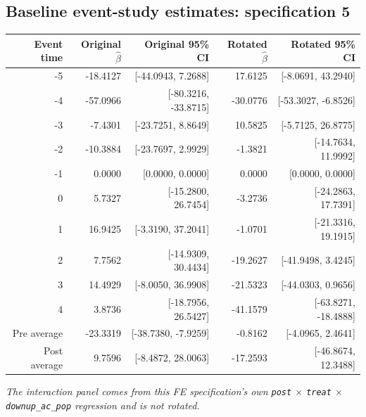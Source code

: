 \documentclass[10pt]{article}
\begin{document}
\subsection*{Baseline event-study estimates: specification 5}
\begin{center}
\scriptsize
\begin{tabular}{r rr rr}
\toprule
Event time & Original $\hat\beta$ & Original 95\% CI & Rotated $\hat\beta$ & Rotated 95\% CI \\
\midrule
-5 & -18.4127 & [-44.0943, 7.2688] & 17.6125 & [-8.0691, 43.2940] \\
-4 & -57.0966 & [-80.3216, -33.8715] & -30.0776 & [-53.3027, -6.8526] \\
-3 & -7.4301 & [-23.7251, 8.8649] & 10.5825 & [-5.7125, 26.8775] \\
-2 & -10.3884 & [-23.7697, 2.9929] & -1.3821 & [-14.7634, 11.9992] \\
-1 & 0.0000 & [0.0000, 0.0000] & 0.0000 & [0.0000, 0.0000] \\
0 & 5.7327 & [-15.2800, 26.7454] & -3.2736 & [-24.2863, 17.7391] \\
1 & 16.9425 & [-3.3190, 37.2041] & -1.0701 & [-21.3316, 19.1915] \\
2 & 7.7562 & [-14.9309, 30.4434] & -19.2627 & [-41.9498, 3.4245] \\
3 & 14.4929 & [-8.0050, 36.9908] & -21.5323 & [-44.0303, 0.9656] \\
4 & 3.8736 & [-18.7956, 26.5427] & -41.1579 & [-63.8271, -18.4888] \\
\midrule
Pre average & -23.3319 & [-38.7380, -7.9259] & -0.8162 & [-4.0965, 2.4641] \\
Post average & 9.7596 & [-8.4872, 28.0063] & -17.2593 & [-46.8674, 12.3488] \\
\bottomrule
\end{tabular}
\end{center}
\medskip
\textit{The interaction panel comes from this FE specification's own \texttt{post} $\times$ \texttt{treat} $\times$ \texttt{downup\_ac\_pop} regression and is not rotated.}
\clearpage
\end{document}
